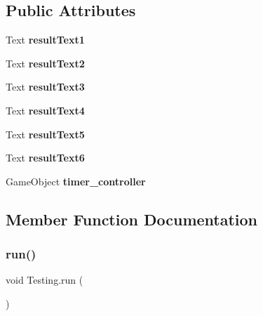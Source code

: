 \subsection*{Public Attributes}
\begin{DoxyCompactItemize}
\item 
\mbox{\label{class_testing_a68cd1cd6fa715cc9f90547c628d376ec}} 
Text {\bfseries result\+Text1}
\item 
\mbox{\label{class_testing_aa814e0ae865edbb9c98880da9f4f15f0}} 
Text {\bfseries result\+Text2}
\item 
\mbox{\label{class_testing_a42a17cb2f7c68c87fcd68b5c1239fffc}} 
Text {\bfseries result\+Text3}
\item 
\mbox{\label{class_testing_af33071c236a9f9b599deb3df07a5b4b4}} 
Text {\bfseries result\+Text4}
\item 
\mbox{\label{class_testing_af4e94827dae65947c67e95a2f702af28}} 
Text {\bfseries result\+Text5}
\item 
\mbox{\label{class_testing_a78e2ded6f301626f2362908f54e14b0a}} 
Text {\bfseries result\+Text6}
\item 
\mbox{\label{class_testing_a4c1c4d2e3917076b4bdfff2c3b0fd0ec}} 
Game\+Object {\bfseries timer\+\_\+controller}
\end{DoxyCompactItemize}


\subsection{Member Function Documentation}
\mbox{\label{class_testing_a936aed5318322b1d36361ff2952fcf10}} 
\subsubsection{\texorpdfstring{run()}{run()}}
{\footnotesize\ttfamily void Testing.\+run (\begin{DoxyParamCaption}{ }\end{DoxyParamCaption})}


